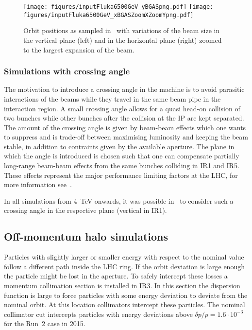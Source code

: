 \begin{figure}[!htb]
\begin{center}
  \texttt{[image: figures/inputFluka6500GeV\_yBGASpng.pdf]}
  \texttt{[image: figures/inputFluka6500GeV\_xBGASZoomXZoomYpng.pdf]}
\end{center}
\vspace{-0.6cm}
 \caption{Orbit positions as sampled in \fluka~with variations of the beam size in the vertical plane (left) and in the horizontal plane (right) zoomed to the largest expansion of the beam.
  \label{BGASflukaInp}}
\end{figure}


\subsubsection{Simulations with crossing angle}
The motivation to introduce a crossing angle in the machine is to avoid parasitic interactions of the beams while they travel in the same beam pipe in the interaction region. A small crossing angle allows for a quasi head-on collision of two bunches while other bunches after the collision at the IP are kept separated. The amount of the crossing angle is given by beam-beam effects which one wants to suppress and is trade-off between maximising luminosity and keeping the beam stable, in addition to contraints given by the available aperture. The plane in which the angle is introduced is chosen such that one can compensate partially long-range beam-beam effects from the same bunches colliding in IR1 and IR5. These effects represent the major performance limiting factors at the LHC, for more information see~\cite{wherrSlides2013,wernerLHCreport}.

In all simulations from 4~TeV onwards, it was possible in \fluka~to consider such a crossing angle in the respective plane (vertical in IR1).

\subsection{Off-momentum halo simulations}
Particles with slightly larger or smaller energy with respect to the nominal value follow a different path inside the LHC ring. If the orbit deviation is large enough the particle might be lost in the aperture. To safely intercept these losses a momentum collimation section is installed in IR3. In this section the dispersion function is large to force particles with some energy deviation to deviate from the nominal orbit. At this location collimators intercept these particles. The nominal collimator cut intercepts particles with energy deviations above $\delta p/p = 1.6\cdot 10^{-3}$ for the Run~2 case in 2015.


